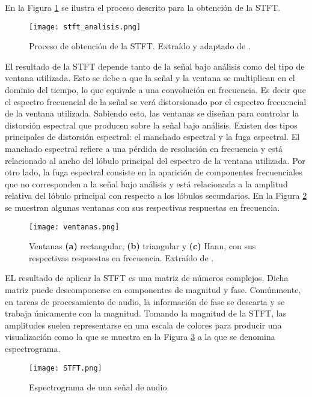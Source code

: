 En la Figura \ref{fig:stft_analisis} se ilustra el proceso descrito para la obtención de la STFT.

\begin{figure}[H]
  \centering{}
  \texttt{[image: stft\_analisis.png]}
  \caption{Proceso de obtención de la STFT. Extraído y adaptado de \cite{matlab}.}
  \label{fig:stft_analisis}
\end{figure}

El resultado de la STFT depende tanto de la señal bajo análisis como del tipo de ventana utilizada. Esto se debe a que la señal y la ventana se multiplican en el dominio del tiempo, lo que equivale a una convolución en frecuencia. Es decir que el espectro frecuencial de la señal se verá distorsionado por el espectro frecuencial de la ventana utilizada. Sabiendo esto, las ventanas se diseñan para controlar la distorsión espectral que producen sobre la señal bajo análisis. Existen dos tipos principales de distorsión espectral: el manchado espectral y la fuga espectral. El manchado espectral refiere a una pérdida de resolución en frecuencia y está relacionado al ancho del lóbulo principal del espectro de la ventana utilizada. Por otro lado, la fuga espectral consiste en la aparición de componentes frecuenciales que no corresponden a la señal bajo análisis y está relacionada a la amplitud relativa del lóbulo principal con respecto a los lóbulos secundarios. En la Figura \ref{fig:ventanas} se muestran algunas ventanas con sus respectivas respuestas en frecuencia.

\begin{figure}[H]
  \centering{}
  \texttt{[image: ventanas.png]}
  \caption{Ventanas \textbf{(a)} rectangular, \textbf{(b)} triangular y \textbf{(c)} Hann, con sus respectivas respuestas en frecuencia. Extraído de \cite{valerio}.}
  \label{fig:ventanas}
\end{figure}

EL resultado de aplicar la STFT es una matriz de números complejos. Dicha matriz puede descomponerse en componentes de magnitud y fase. Comúnmente, en tareas de procesamiento de audio, la información de fase se descarta y se trabaja únicamente con la magnitud. Tomando la magnitud de la STFT, las amplitudes suelen representarse en una escala de colores para producir una visualización como la que se muestra en la Figura \ref{fig:STFT} a la que se denomina espectrograma.

 \begin{figure}[H]
  \centering{}
  \texttt{[image: STFT.png]}
  \caption{Espectrograma de una señal de audio.}
  \label{fig:STFT}
\end{figure}


